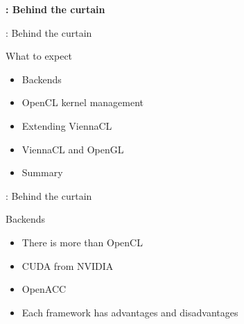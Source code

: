 
\begin{frame}{ }
 \begin{center}
  \Large \textbf{\ViennaCL : Behind the curtain}
 \end{center}
\end{frame}


\begin{frame}{\ViennaCL : Behind the curtain}

\begin{block}{What to expect}
  \begin{itemize}
   \item Backends
   \item OpenCL kernel management
   \item Extending ViennaCL
   \item ViennaCL and OpenGL
   \item Summary
  \end{itemize}
\end{block}

\end{frame}



\begin{frame}{\ViennaCL : Behind the curtain}

\begin{block}{Backends}
  \begin{itemize}
   \item There is more than OpenCL
   \item CUDA from NVIDIA
   \item OpenACC
   \item Each framework has advantages and disadvantages
  \end{itemize}
\end{block}

\end{frame}



